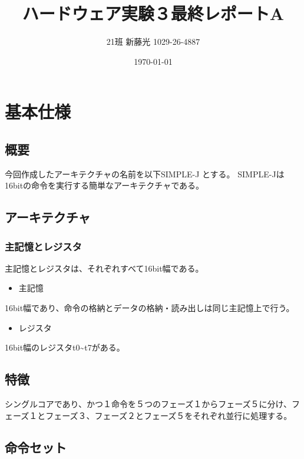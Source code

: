 \documentclass{jarticle}
\author{21班 新藤光 1029-26-4887}
\date{\today}
\title{ハードウェア実験３最終レポートA}
\begin{document}
\maketitle

\section{基本仕様}
\label{sec-1}
\subsection{概要}
\label{sec-1-1}
今回作成したアーキテクチャの名前を以下SIMPLE-J とする。
SIMPLE-Jは16bitの命令を実行する簡単なアーキテクチャである。
\subsection{アーキテクチャ}
\label{sec-1-2}
\subsubsection{主記憶とレジスタ}
\label{sec-1-2-1}
主記憶とレジスタは、それぞれすべて16bit幅である。
\begin{itemize}
\item 主記憶
\end{itemize}
16bit幅であり、命令の格納とデータの格納・読み出しは同じ主記憶上で行う。
\begin{itemize}
\item レジスタ
\end{itemize}
16bit幅のレジスタt0\textasciitilde{}t7がある。
\subsection{特徴}
\label{sec-1-3}
シングルコアであり、かつ１命令を５つのフェーズ１からフェーズ５に分け、フェーズ１とフェーズ３、フェーズ２とフェーズ５をそれぞれ並行に処理する。
\subsection{命令セット}
\label{sec-1-4}
\end{document}
